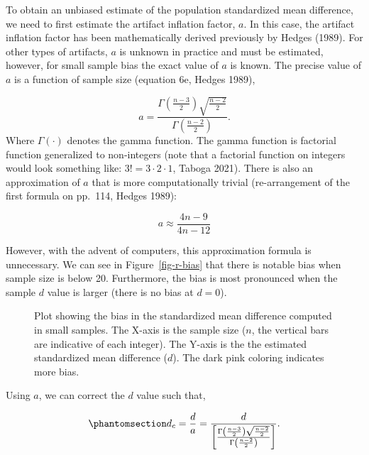 \documentclass[
  letterpaper,
  DIV=11,
  numbers=noendperiod]{scrreprt}
\begin{document}
To obtain an unbiased estimate of the population standardized mean
difference, we need to first estimate the artifact inflation factor,
\(a\). In this case, the artifact inflation factor has been
mathematically derived previously by Hedges (1989). For other types of
artifacts, \(a\) is unknown in practice and must be estimated, however,
for small sample bias the exact value of \(a\) is known. The precise
value of \(a\) is a function of sample size (equation 6e, Hedges 1989),

\[
a = \frac{\Gamma\left(\frac{n-3}{2}\right)\sqrt{\frac{n-2}{2}}}{\Gamma\left(\frac{n-2}{2}\right)}.
\] Where \(\Gamma(\cdot)\) denotes the gamma function. The gamma
function is factorial function generalized to non-integers (note that a
factorial function on integers would look something like:
\(3! = 3 \cdot 2 \cdot 1\), Taboga 2021). There is also an approximation
of \(a\) that is more computationally trivial (re-arrangement of the
first formula on pp.~114, Hedges 1989):

\[
a \approx \frac{4n-9}{4n-12}
\]

However, with the advent of computers, this approximation formula is
unnecessary. We can see in Figure~\ref{fig-r-bias} that there is notable
bias when sample size is below 20. Furthermore, the bias is most
pronounced when the sample \(d\) value is larger (there is no bias at
\(d=0\)).

\begin{figure}[H]


\caption{\label{fig-d-bias}Plot showing the bias in the standardized
mean difference computed in small samples. The X-axis is the sample size
(\(n\), the vertical bars are indicative of each integer). The Y-axis is
the the estimated standardized mean difference (\(d\)). The dark pink
coloring indicates more bias.}

\end{figure}%

Using \(a\), we can correct the \(d\) value such that,

\begin{equation}\phantomsection\label{eq-d-corr}{
d_c = \frac{d}{a} = \frac{d}{ \left[\frac{\Gamma\left(\frac{n-3}{2}\right)\sqrt{\frac{n-2}{2}}}{\Gamma\left(\frac{n-2}{2}\right)}\right]}.
}\end{equation}
\end{document}
